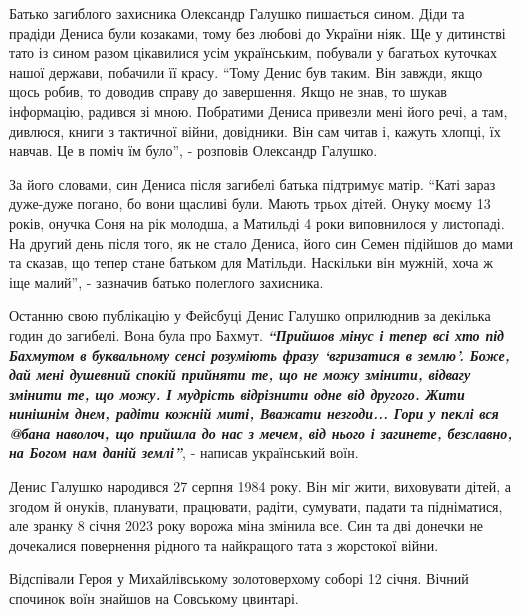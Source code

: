 
Батько загиблого захисника Олександр Галушко пишається сином. Діди та прадіди
Дениса були козаками, тому без любові до України ніяк. Ще у дитинстві тато із
сином разом цікавилися усім українським, побували у багатьох куточках нашої
держави, побачили її красу. \enquote{Тому Денис був таким. Він завжди, якщо
щось робив, то доводив справу до завершення. Якщо не знав, то шукав інформацію,
радився зі мною. Побратими Дениса привезли мені його речі, а там, дивлюся,
книги з тактичної війни, довідники. Він сам читав і, кажуть хлопці, їх навчав.
Це в поміч їм було}, - розповів Олександр Галушко.

За його словами, син Дениса після загибелі батька підтримує матір.
\enquote{Каті зараз дуже-дуже погано, бо вони щасливі були. Мають трьох дітей.
Онуку моєму 13 років, онучка Соня на рік молодша, а Матильді 4 роки виповнилося
у листопаді.  На другий день після того, як не стало Дениса, його син Семен
підійшов до мами та сказав, що тепер стане батьком для Матільди. Наскільки він
мужній, хоча ж іще малий}, - зазначив батько полеглого захисника.

Останню свою публікацію у Фейсбуці Денис Галушко оприлюднив за декілька годин
до загибелі. Вона була про Бахмут. {\color{blue}\bfseries\em\enquote{Прийшов мінус і тепер всі хто під
Бахмутом в буквальному сенсі розуміють фразу \enquote{вгризатися в землю}.
Боже, дай мені душевний спокій прийняти те, що не можу змінити, відвагу змінити
те, що можу. І мудрість відрізнити одне від другого. Жити нинішнім днем, радіти
кожній миті, Вважати незгоди... Гори у пеклі вся @бана наволоч, що прийшла до
нас з мечем, від нього і загинете, безславно, на Богом нам даній землі}}, -
написав український воїн.

Денис Галушко народився 27 серпня 1984 року. Він міг жити, виховувати дітей, а
згодом й онуків, планувати, працювати, радіти, сумувати, падати та підніматися,
але зранку 8 січня 2023 року ворожа міна змінила все. Син та дві донечки не
дочекалися повернення рідного та найкращого тата з жорстокої війни.


Відспівали Героя у Михайлівському золотоверхому соборі 12 січня. Вічний
спочинок воїн знайшов на Совському цвинтарі.
